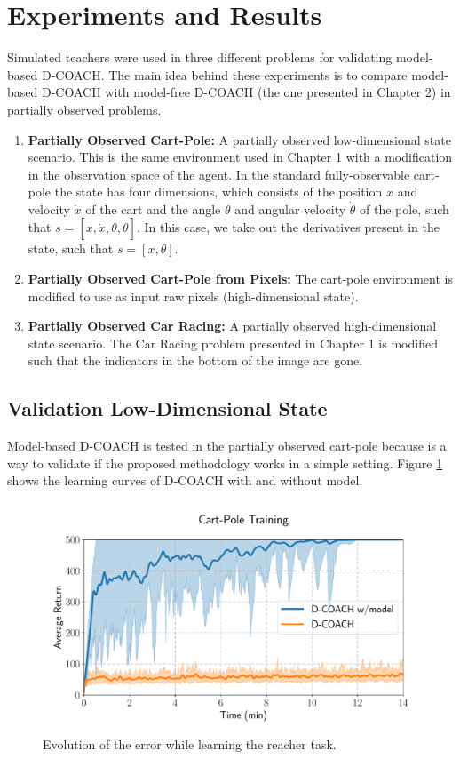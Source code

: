\section{Experiments and Results}
Simulated teachers were used in three different problems for validating model-based D-COACH. The main idea behind these experiments is to compare model-based D-COACH with model-free D-COACH (the one presented in Chapter 2) in partially observed problems.

\begin{enumerate}
    \item \textbf{Partially Observed Cart-Pole:} A partially observed low-dimensional state scenario. This is the same environment used in Chapter 1 with a modification in the observation space of the agent. In the standard fully-observable cart-pole the state has four dimensions, which consists of the position $x$ and velocity $\dot x$ of the cart and the angle $\theta$ and angular velocity $\dot \theta$ of the pole, such that $s=[x, \dot x, \theta, \dot \theta]$. In this case, we take out the derivatives present in the state, such that $s=[x, \theta]$.
    \item \textbf{Partially Observed Cart-Pole from Pixels:} The cart-pole environment is modified to use as input raw pixels (high-dimensional state). 
    \item \textbf{Partially Observed Car Racing:} A partially observed high-dimensional state scenario. The Car Racing problem presented in Chapter 1 is modified such that the indicators in the bottom of the image are gone. 
    
\end{enumerate}

\subsection{Validation Low-Dimensional State}

Model-based D-COACH is tested in the partially observed cart-pole because is a way to validate if the proposed methodology works in a simple setting. Figure \ref{fig:ld_cartpole_model} shows the learning curves of D-COACH with and without model. 

\begin{figure}[h]
    \centering
    \includegraphics[width=0.9\linewidth]{imagenes/cap3/cartpole_LD_model.pdf}
    \caption{Evolution of the error while learning the reacher task. }
    \label{fig:ld_cartpole_model}
\end{figure}


